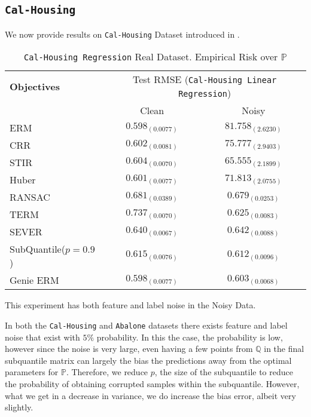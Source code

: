 \documentclass{article} %
\newcommand{\subhead}[1]{\multicolumn{1}{c}{#1}}%
\begin{document}
\begin{appendices}
	\subsection{\texttt{Cal-Housing}}
	We now provide results on \texttt{Cal-Housing} Dataset introduced in \cite{Kelley1997}.
	\begin{table}[!h]
		\centering
		\begin{tabular}{lcc}
			\toprule 
			\textbf{Objectives}&\multicolumn{2}{c}{Test RMSE (\texttt{Cal-Housing Linear Regression})}\\                   
			\cmidrule(rl){2-3}
			&\subhead{Clean}& \subhead{Noisy}\\ 
			\midrule
			ERM  &$0.598_{(0.0077)}$&$81.758_{(2.6230)}$\\
			CRR \cite{bhatia2017}  &$\mathbf{0.602_{(0.0081)}}$&$75.777_{(2.9403)}$\\
			STIR \cite{pmlr-v89-mukhoty19a}  &$\mathbf{0.604_{(0.0070)}}$&$65.555_{(2.1899)}$\\
			Huber \cite{Huber2009} &$\mathbf{0.601_{(0.0077)}}$&$71.813_{(2.0755)}$\\
			RANSAC \cite{RANSAC1981} &$0.681_{(0.0389)}$&$0.679_{(0.0253)}$\\
			TERM \cite{li2020tilted} &$0.737_{(0.0070)}$&$0.625_{(0.0083)}$\\
			SEVER \cite{DiakonikolasKKLSS19} &$0.640_{(0.0067)}$&$0.642_{(0.0088)}$\\
			\rowcolor{LightCyan}
			SubQuantile($p = 0.9$) &$\mathbf{0.615_{(0.0076)}}$&$\mathbf{0.612_{(0.0096)}}$\\
			\midrule 
			Genie ERM &$0.598_{(0.0077)}$&$0.603_{(0.0068)}$\\
			\bottomrule
		\end{tabular}
		\caption{\texttt{Cal-Housing Regression} Real Dataset. Empirical Risk over $\mathbb{P}$}
		\label{tab:Cal-Housing-regression}
	\end{table}
	This experiment has both feature and label noise in the Noisy Data.
	
	
	
	In both the \texttt{Cal-Housing} and \texttt{Abalone} datasets there exists feature and label noise that exist with $5\%$ probability. In this the case, the probability is low, however since the noise is very large, even having a few points from $\mathbb{Q}$ in the final subquantile matrix can largely the bias the predictions away from the optimal parameters for $\mathbb{P}$. Therefore, we reduce $p$, the size of the subquantile to reduce the probability of obtaining corrupted samples within the subquantile. However, what we get in a decrease in variance, we do increase the bias error, albeit very slightly. 
	

\end{appendices}
\end{document}
